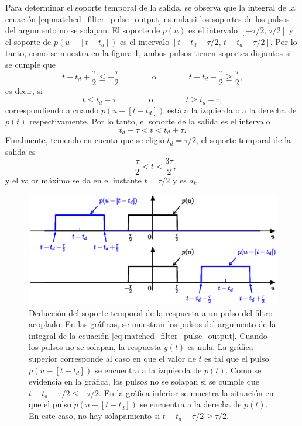 \documentclass[a4paper]{article}
\begin{document}
Para determinar el soporte temporal de la salida, se observa que la integral de la ecuación \ref{eq:matched_filter_pulse_output} es nula si los soportes de los pulsos del argumento no se solapan.
El soporte de \(p(u)\) es el intervalo \([-\tau/2,\,\tau/2]\) y el soporte de \(p(u-\left[t-t_d\right])\) es el intervalo \([t-t_d-\tau/2,\,t-t_d+\tau/2]\). Por lo tanto, como se muestra en la figura \ref{fig:matched_filter_output_support}, ambos pulsos tienen soportes disjuntos si se cumple que
\[
 t-t_d+\dfrac{\tau}{2} \leq -\dfrac{\tau}{2}\qquad\qquad\textrm{o}\qquad\qquad t-t_d-\dfrac{\tau}{2} \geq  \dfrac{\tau}{2},
\]
es decir, si
\[
 t\leq t_d-\tau\qquad\qquad\textrm{o}\qquad\qquad t \geq  t_d+\tau,
\]
correspondiendo a cuando \(p(u-\left[t-t_d\right])\) está a la izquierda o a la derecha de \(p(t)\) respectivamente. Por lo tanto, el soporte de la salida es el intervalo
\[
 t_d-\tau < t < t_d+\tau.
\]
Finalmente, teniendo en cuenta que se eligió \(t_d=\tau/2\), el soporte temporal de la salida es
\[
 -\frac{\tau}{2} < t < \frac{3\tau}{2},
\]
y el valor máximo se da en el instante \(t=\tau/2\) y es \(a_k\).
\begin{figure}[!htb]
\begin{center}
\includegraphics[width=0.9\columnwidth]{figuras/matched_filter_output_support.eps}
\caption{\label{fig:matched_filter_output_support} Deducción del soporte temporal de la respuesta a un pulso del filtro acoplado. En las gráficas, se muestran los pulsos del argumento de la integral de la ecuación \ref{eq:matched_filter_pulse_output}. Cuando los pulsos no se solapan, la respuesta \(y(t)\) es nula. La gráfica superior corresponde al caso en que el valor de \(t\) es tal que el pulso \(p(u-[t-t_d])\) se encuentra a la izquierda de \(p(t)\). Como se evidencia en la gráfica, los pulsos no se solapan si se cumple que \(t-t_d+\tau/2 \leq -\tau/2\). En la gráfica inferior se muestra la situación en que el pulso \(p(u-[t-t_d])\) se encuentra a la derecha de \(p(t)\). En este caso, no hay solapamiento si \(t-t_d-\tau/2 \geq \tau/2\).}
\end{center}
\end{figure}
 
\end{document}
